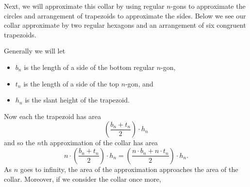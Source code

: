 \documentclass[hints,handout,noauthor,nooutcomes,12pt]{ximera}
\begin{document}
\begin{image}
\end{image}
Next, we will approximate this collar by using regular $n$-gons to
approximate the circles and arrangement of trapezoids to approximate
the sides. Below we see our collar approximate by two regular hexagons
and an arrangement of six congruent trapezoids. 
\begin{image}
\end{image}
Generally we will let
\begin{itemize}
\item $b_{n}$ is the length of a side of the bottom regular $n$-gon,
\item $t_{n}$ is the length of a side of the top $n$-gon, and
\item $h_{n}$ is the slant height of the trapezoid.
\end{itemize}
Now each the trapezoid has area
\[
\left(  \frac{b_{n}+t_{n}}{2}\right)  \cdot h_{n}%
\]
and so the $n$th approximation of the collar has area
\[
n\cdot \left(  \frac{b_{n}+t_{n}}{2}\right)
\cdot h_{n}=\left(  \frac{n\cdot %
b_{n}+n\cdot t_{n}}{2}\right) \cdot h_{n}.
\]
As $n$ goes to infinity, the area of the approximation approaches the
area of the collar. Moreover, if we consider the collar once more,
\end{document}
